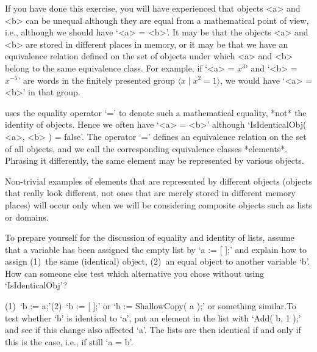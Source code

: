 If  you have done this  exercise, you  will  have experienced that {\GAP}
objects  <a>  and  <b> can  be  unequal  although they are   equal from a
mathematical point of view, i.e., although we should have `<a> = <b>'. It
may  be that the objects <a>  and <b> are  stored  in different places in
memory, or it may be that we have  an equivalence relation defined on the
set of  objects under which <a>  and <b> belong   to the same equivalence
class.  For example, if `<a>  = $x^3$' and  `<b> = $x^{-5}$' are words in
the finitely presented group $\langle  x\mid x^2=1\rangle$, we would have
`<a> = <b>' in that group.

{\GAP}   uses  the equality operator  `='  to  denote such a mathematical
equality, *not* the identity of objects. Hence we often  have `<a> = <b>'
although `IsIdenticalObj( <a>, <b> ) =  false'.  The operator `=' defines
an equivalence relation on the set of all {\GAP} objects, and we call the
corresponding  equivalence classes *elements*.   Phrasing it differently,
the same element may be represented by various {\GAP} objects.

Non-trivial examples of   elements   that are represented by    different
objects (objects  that really  look different,  not ones  that are merely
stored in  different  memory places)  will  occur only   when  we will be
considering composite objects such as lists or domains.

\exercise To prepare yourself for the discussion of equality and identity
of lists, assume  that a variable has been  assigned the empty list by `a
:=  [ ];' and   explain how to  assign  (1)~the same (identical)  object,
(2)~an equal  object to another variable  `b'. How can someone  else test
which alternative you chose without using `IsIdenticalObj'?

\answer (1)~`b := a;'\quad (2)~`b := [ ];' or `b := ShallowCopy( a );' or
something similar.\quad  To test whether `b'  is identical to `a', put an
element  in the list with  `Add(  b, 1  );'  and see  if this change also
affected `a'.  The lists are then  identical if and only  if  this is the
case, i.e., if still `a = b'.



